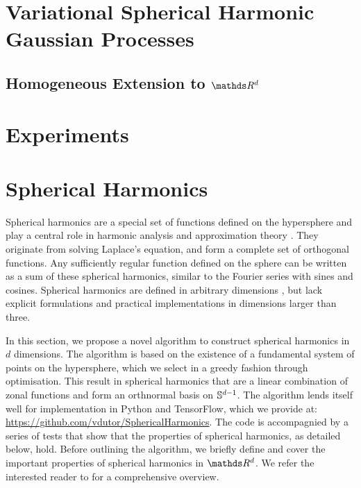 \section{Variational Spherical Harmonic Gaussian Processes}
\label{sec:vish}

\subsection{Homogeneous Extension to $\Reals^d$}


\section{Experiments}


\section{Spherical Harmonics}
\label{section:spherical-harmonics}

Spherical harmonics are a special set of functions defined on the hypersphere and play a central role in harmonic analysis and approximation theory \citep{wendland2005}. They originate from solving Laplace's equation, and form a complete set of orthogonal functions. Any sufficiently regular function defined on the sphere can be written as a sum of these spherical harmonics, similar to the Fourier series with sines and cosines. Spherical harmonics are defined in arbitrary dimensions \citep{frye2014,dai2013}, but lack explicit formulations and practical implementations in dimensions larger than three. %

In this section, we propose a novel algorithm to construct spherical harmonics in $d$ dimensions. The algorithm is based on the existence of a fundamental system of points on the hypersphere, which we select in a greedy fashion through optimisation. This result in spherical harmonics that are a linear combination of zonal functions and form an orthnormal basis on $\mathbb{S}^{d-1}$. The algorithm lends itself well for implementation in Python and TensorFlow, which we provide at: \url{https://github.com/vdutor/SphericalHarmonics}. The code is accompagnied by a series of tests that show that the properties of spherical harmonics, as detailed below, hold. Before outlining the algorithm, we briefly define and cover the important properties of spherical harmonics in $\Reals^d$. We refer the interested reader to \citet{dai2013,frye2014} for a comprehensive overview.

